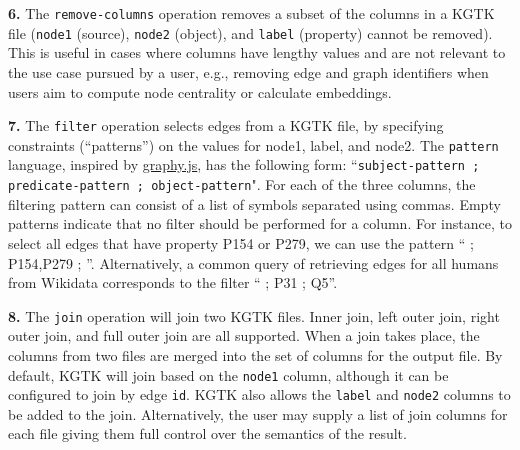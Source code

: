 \documentclass[runningheads]{llncs}
\newcommand{\kibitz}[2]{%
{\color{#1}#2}{}%
}
\newcommand{\DG}[1]{\kibitz{red}{[DG: #1]}} %
\begin{document}
\textbf{6.} The \texttt{remove-columns} operation 
removes a subset of the columns in a KGTK file (\texttt{node1} (source), \texttt{node2} (object), and \texttt{label} (property) cannot be removed). 
This is useful in cases where columns have lengthy values and are not relevant to the use case pursued by a user, e.g., removing edge and graph identifiers when users aim to compute node centrality or calculate embeddings.%



\textbf{7.} The \texttt{filter} operation selects edges from a KGTK file, by specifying constraints (``patterns'') on the values for node1, label, and node2. The \texttt{pattern} language, inspired by \url{graphy.js}, has the following form: ``\texttt{subject-pattern ; predicate-pattern ; object-pattern}".
For each of the three columns, the filtering pattern can consist of a list of symbols separated using commas. Empty patterns indicate that no filter should be performed for a column. For instance, to select all edges that have property P154 or P279, we can use the pattern `` ; P154,P279 ; ''. Alternatively, a common query of retrieving edges for all humans from Wikidata corresponds to the filter `` ; P31 ; Q5''.



\textbf{8.} The \texttt{join} operation will join two KGTK files. %
Inner join, left outer join, right outer join, and full outer join are all supported. %
When a join takes place, the columns from two files are merged into the set of columns for the output file.
By default, KGTK will join based on the \texttt{node1} column, although it can be configured to join by edge \texttt{id}. 
KGTK also allows the \texttt{label} and \texttt{node2} columns to be added to the join. 
Alternatively, the user may supply a list of join columns for each file giving them full control over the semantics of the result. 
\end{document}
